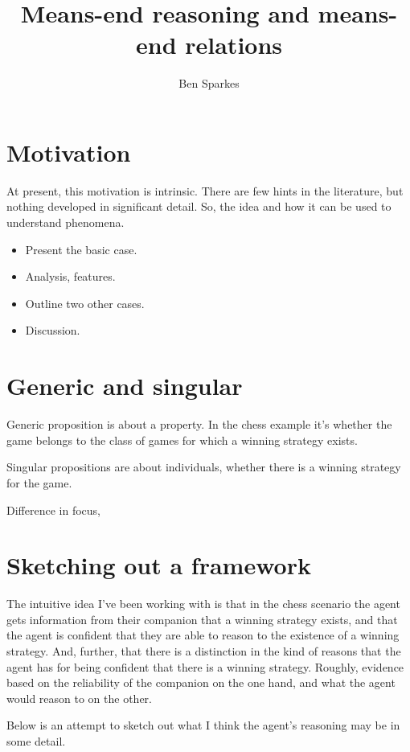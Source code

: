 \documentclass[10pt]{article}
\title{Means-end reasoning and means-end relations}
\author{Ben Sparkes}
\begin{document}
\section{Motivation}
\label{sec:motivation}

At present, this motivation is intrinsic.
There are few hints in the literature, but nothing developed in significant detail.
So, the idea and how it can be used to understand phenomena.

\begin{itemize}
\item Present the basic case.
\item Analysis, features.
\item Outline two other cases.
\item Discussion.
\end{itemize}


\section{Generic and singular}
\label{sec:generic-singular}

Generic proposition is about a property.
In the chess example it's whether the game belongs to the class of games for which a winning strategy exists.

Singular propositions are about individuals, whether there is a winning strategy for the game.

Difference in focus, 


\section{Sketching out a framework}
\label{sec:sketch-out-fram}

\begin{note}
  The intuitive idea I've been working with is that in the chess scenario the agent gets information from their companion that a winning strategy exists, and that the agent is confident that they are able to reason to the existence of a winning strategy.
  And, further, that there is a distinction in the kind of reasons that the agent has for being confident that there is a winning strategy.
  Roughly, evidence based on the reliability of the companion on the one hand, and what the agent would reason to on the other.

  Below is an attempt to sketch out what I think the agent's reasoning may be in some detail.
\end{note}
\end{document}
